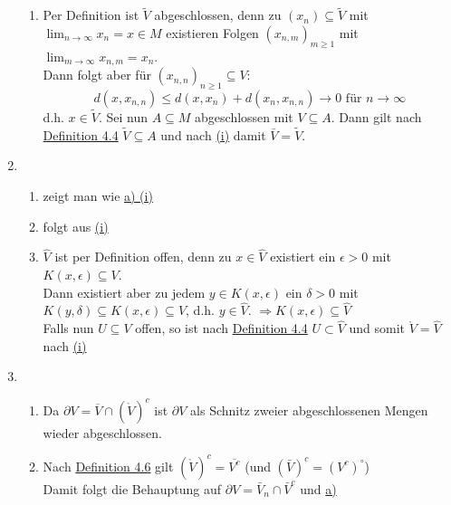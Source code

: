 \begin{prop}
\begin{beweis}
\begin{enumerate}[label=\alph*\upshape)]
\begin{enumerate}
					\item Per Definition ist $\tilde V$ abgeschlossen, denn zu $(x_{n}) \subseteq \tilde V$ mit $\lim_{n \rightarrow \infty} x_{n} = x \in M$ existieren Folgen $(x_{n, m})_{m \geq 1}$ mit  $\lim_{m \rightarrow \infty} x_{n, m} = x_{n}$. \\
						Dann folgt aber für $(x_{n, n})_{n \geq 1} \subseteq V$:
						\[ d(x, x_{n, n}) \leq d(x, x_{n}) + d(x_{n}, x_{n, n}) \rightarrow 0 \text{ für } n \rightarrow \infty \]
						d.h. $x \in \tilde V$. Sei nun $A \subseteq M$ abgeschlossen mit $V \subseteq A$. Dann gilt nach \hyperref[def:4.4-AbgeschlossenOffen-abgoff]{Definition 4.4} $\tilde V \subseteq A$ und nach \hyperref[prop:4.8.a1]{(i)} damit $\bar V = \tilde V$.
				\end{enumerate} 
			\item 
				\begin{enumerate}
					\item zeigt man wie \hyperref[prop:4.8.a1-proof]{a) (i)}
					\item folgt aus \hyperref[prop:4.8.b1]{(i)}
					\item $\hat V$ ist per Definition offen, denn zu $x \in \hat V$ existiert ein $\epsilon > 0$ mit  $K(x, \epsilon) \subseteq V$. \\
						 Dann existiert aber zu jedem $y \in K(x, \epsilon)$ ein $\delta > 0$ mit $K(y, \delta) \subseteq K(x, \epsilon) \subseteq V$, d.h. $y \in \hat V$. $\Rightarrow K(x, \epsilon) \subseteq \hat V$ \\
						 Falls nun $U \subseteq V$ offen, so ist nach \hyperref[def:4.4-AbgeschlossenOffen-abgoff]{Definition 4.4} $U \subset \hat V$ und somit $\mathring V = \hat V$ nach \hyperref[prop:4.8.b1]{(i)}
				\end{enumerate} 
			\item
				\begin{enumerate}
					\item Da $\partial V = \overline{V} \cap (\mathring{V})^{c}$ ist $\partial V$ als Schnitz zweier abgeschlossenen Mengen wieder abgeschlossen.
					\item Nach \hyperref[def:4.7-AbschlussInnereRand]{Definition 4.6} gilt $(\mathring{V})^{c} = \overline{V^{c}}$ \quad (und $\left( \bar V \right)^{c} = \left( V^{c} \right)^{\circ}$) \\
						Damit folgt die Behauptung auf $\partial V = \bar V_{n} \cap \bar V^{c}$ und \hyperref[prop:4.8.a1]{a)}
				\end{enumerate} 
		\end{enumerate}	
	\end{beweis}
\end{prop}


